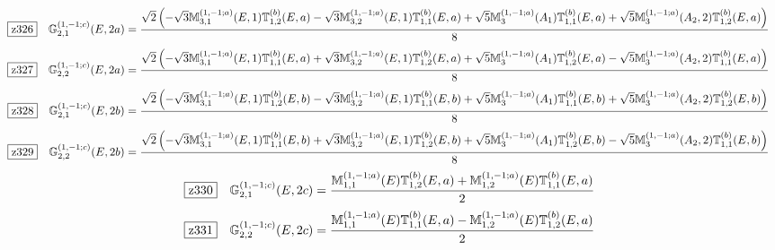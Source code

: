 \documentclass[fleqn,10pt,landscape]{jsarticle}
\begin{document}
\begin{dmath*}
\hspace*{3mm}\fbox{z326}\quad \mathbb{G}_{2,1}^{(1,-1;c)}(E,2a)=\frac{\sqrt{2} \left(- \sqrt{3} \mathbb{M}_{3,1}^{(1,-1;a)}(E,1) \mathbb{T}_{1,2}^{(b)}(E,a) - \sqrt{3} \mathbb{M}_{3,2}^{(1,-1;a)}(E,1) \mathbb{T}_{1,1}^{(b)}(E,a) + \sqrt{5} \mathbb{M}_{3}^{(1,-1;a)}(A_{1}) \mathbb{T}_{1,1}^{(b)}(E,a) + \sqrt{5} \mathbb{M}_{3}^{(1,-1;a)}(A_{2},2) \mathbb{T}_{1,2}^{(b)}(E,a)\right)}{8}
\end{dmath*}
\begin{dmath*}
\hspace*{3mm}\fbox{z327}\quad \mathbb{G}_{2,2}^{(1,-1;c)}(E,2a)=\frac{\sqrt{2} \left(- \sqrt{3} \mathbb{M}_{3,1}^{(1,-1;a)}(E,1) \mathbb{T}_{1,1}^{(b)}(E,a) + \sqrt{3} \mathbb{M}_{3,2}^{(1,-1;a)}(E,1) \mathbb{T}_{1,2}^{(b)}(E,a) + \sqrt{5} \mathbb{M}_{3}^{(1,-1;a)}(A_{1}) \mathbb{T}_{1,2}^{(b)}(E,a) - \sqrt{5} \mathbb{M}_{3}^{(1,-1;a)}(A_{2},2) \mathbb{T}_{1,1}^{(b)}(E,a)\right)}{8}
\end{dmath*}
\begin{dmath*}
\hspace*{3mm}\fbox{z328}\quad \mathbb{G}_{2,1}^{(1,-1;c)}(E,2b)=\frac{\sqrt{2} \left(- \sqrt{3} \mathbb{M}_{3,1}^{(1,-1;a)}(E,1) \mathbb{T}_{1,2}^{(b)}(E,b) - \sqrt{3} \mathbb{M}_{3,2}^{(1,-1;a)}(E,1) \mathbb{T}_{1,1}^{(b)}(E,b) + \sqrt{5} \mathbb{M}_{3}^{(1,-1;a)}(A_{1}) \mathbb{T}_{1,1}^{(b)}(E,b) + \sqrt{5} \mathbb{M}_{3}^{(1,-1;a)}(A_{2},2) \mathbb{T}_{1,2}^{(b)}(E,b)\right)}{8}
\end{dmath*}
\begin{dmath*}
\hspace*{3mm}\fbox{z329}\quad \mathbb{G}_{2,2}^{(1,-1;c)}(E,2b)=\frac{\sqrt{2} \left(- \sqrt{3} \mathbb{M}_{3,1}^{(1,-1;a)}(E,1) \mathbb{T}_{1,1}^{(b)}(E,b) + \sqrt{3} \mathbb{M}_{3,2}^{(1,-1;a)}(E,1) \mathbb{T}_{1,2}^{(b)}(E,b) + \sqrt{5} \mathbb{M}_{3}^{(1,-1;a)}(A_{1}) \mathbb{T}_{1,2}^{(b)}(E,b) - \sqrt{5} \mathbb{M}_{3}^{(1,-1;a)}(A_{2},2) \mathbb{T}_{1,1}^{(b)}(E,b)\right)}{8}
\end{dmath*}
\begin{dmath*}
\hspace*{3mm}\fbox{z330}\quad \mathbb{G}_{2,1}^{(1,-1;c)}(E,2c)=\frac{\mathbb{M}_{1,1}^{(1,-1;a)}(E) \mathbb{T}_{1,2}^{(b)}(E,a) + \mathbb{M}_{1,2}^{(1,-1;a)}(E) \mathbb{T}_{1,1}^{(b)}(E,a)}{2}
\end{dmath*}
\begin{dmath*}
\hspace*{3mm}\fbox{z331}\quad \mathbb{G}_{2,2}^{(1,-1;c)}(E,2c)=\frac{\mathbb{M}_{1,1}^{(1,-1;a)}(E) \mathbb{T}_{1,1}^{(b)}(E,a) - \mathbb{M}_{1,2}^{(1,-1;a)}(E) \mathbb{T}_{1,2}^{(b)}(E,a)}{2}
\end{dmath*}
\end{document}
